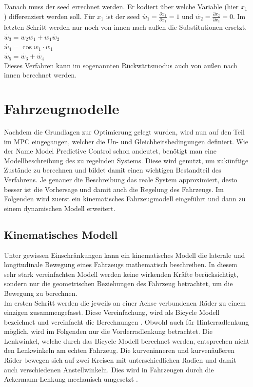 \documentclass{like}
\begin{document}
Danach muss der seed errechnet werden. Er kodiert über welche Variable (hier $x_1$) differenziert werden soll. Für $x_1$ ist der seed $\dot{w_1} = \frac{\partial x_1}{\partial x_1} = 1$ und   $\dot{w_2} = \frac{\partial x_2}{\partial x_1} = 0$.
Im letzten Schritt werden nur noch von innen nach außen die Substitutionen ersetzt. \\
$\dot{w_3} = w_2\dot{w_1} + w_1 \dot{w_2}$ \\
$\dot{w_4} = \cos{w_1} \cdot \dot{w_1}$ \\
$\dot{w_5} = \dot{w_3} + \dot{w_4}$ \\
Dieses Verfahren kann im sogenannten Rückwärtsmodus auch von außen nach innen berechnet werden.  

\newpage
\section{Fahrzeugmodelle}
Nachdem die Grundlagen zur Optimierung gelegt wurden, wird nun auf den Teil im \ac{MPC} eingegangen, welcher die Un- und Gleichheitsbedingungen definiert.
Wie der Name Model Predictive Control schon andeutet, benötigt man eine Modellbeschreibung des zu regelnden Systems. Diese wird genutzt, um zukünftige Zustände zu berechnen und bildet damit einen wichtigen Bestandteil des Verfahrens. Je genauer die Beschreibung das reale System approximiert, desto besser ist die Vorhersage und damit auch die Regelung des Fahrzeugs.
Im Folgenden wird zuerst ein kinematisches Fahrzeugmodell eingeführt und dann zu einem dynamischen Modell erweitert.   

\subsection{Kinematisches Modell}
\label{kinematicModel}
Unter gewissen Einschränkungen kann ein kinematisches Modell die laterale und longitudinale Bewegung eines Fahrzeugs mathematisch beschreiben. In diesem sehr stark vereinfachten Modell werden keine wirkenden Kräfte berücksichtigt, sondern nur die geometrischen Beziehungen des Fahrzeug betrachtet, um die Bewegung zu berechnen. \\
Im ersten Schritt werden die jeweils an einer Achse verbundenen Räder zu einem einzigen zusammengefasst. Diese Vereinfachung, wird als Bicycle Modell bezeichnet und vereinfacht die Berechnungen \cite{BicycleModel}. Obwohl auch für Hinterradlenkung möglich, wird im Folgenden nur die Vorderradlenkung betrachtet. Die Lenkwinkel, welche durch das Bicycle Modell berechnet werden, entsprechen nicht den Lenkwinkeln am echten Fahrzeug. Die kurveninneren und kurvenäußeren Räder bewegen sich auf zwei Kreisen mit unterschiedlichen Radien und damit auch verschiedenen Anstellwinkeln. Dies wird in Fahrzeugen durch die Ackermann-Lenkung mechanisch umgesetzt \cite{rajamani2011vehicle}.
\end{document}
